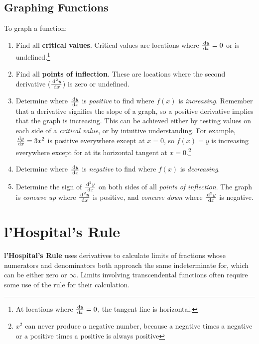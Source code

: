 \subsection{Graphing Functions}
To graph a function:
  \begin{enumerate}
   \item Find all \textbf{critical values}. Critical values are locations where $\frac{\,\mathrm{d} y}{\,\mathrm{d} x}=0$ or is undefined.\footnote{At locations where $\frac{\,\mathrm{d} y}{\,\mathrm{d} x}=0$, the tangent line is horizontal.}
   \item Find all \textbf{points of inflection}. These are locations where the second derivative ($\frac{\,\mathrm{d}^2y}{\,\mathrm{d} x}$) is zero or undefined.
   \item Determine where $\frac{\,\mathrm{d} y}{\,\mathrm{d} x}$ is \emph{positive} to find where $f(x)$ is \emph{increasing}. Remember that a derivative signifies the slope of a graph, so a positive derivative implies that the graph is increasing. This can be achieved either by testing values on each side of a \emph{critical value}, or by intuitive understanding. For example, $\frac{\,\mathrm{d} y}{\,\mathrm{d} x}=3x^2$ is positive everywhere except at $x=0$, so $f(x)=y$ is increasing everywhere except for at its horizontal tangent at $x=0$.\footnote{$x^2$ can never produce a negative number, because a negative times a negative or a positive times a positive is always positive}
   \item Determine where $\frac{\,\mathrm{d} y}{\,\mathrm{d} x}$ is \emph{negative} to find where $f(x)$ is \emph{decreasing}.
   \item Determine the sign of $\frac{\,\mathrm{d}^2y}{\,\mathrm{d} x}$ on both sides of all \emph{points of inflection}. The graph is \emph{concave up} where $\frac{\,\mathrm{d}^2y}{\,\mathrm{d} x}$ is positive, and \emph{concave down} where $\frac{\,\mathrm{d}^2y}{\,\mathrm{d} x}$ is negative.
  \end{enumerate}
\section{l'Hospital's Rule}

\textbf{l'Hospital's Rule} uses derivatives to calculate limits of fractions whose numerators and denominators both approach the same indeterminate for, which can be either zero or $\infty$. Limits involving transcendental functions often require some use of the rule for their calculation.

